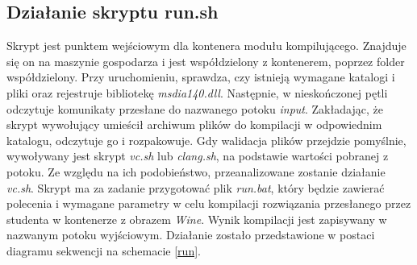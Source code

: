 \subsection{Działanie skryptu run.sh}
Skrypt jest punktem wejściowym dla kontenera modułu kompilującego. Znajduje się on na maszynie gospodarza i jest współdzielony z kontenerem, poprzez folder współdzielony. Przy uruchomieniu, sprawdza, czy istnieją wymagane katalogi i pliki oraz rejestruje bibliotekę \textit{msdia140.dll}. Następnie, w nieskończonej pętli odczytuje komunikaty przesłane do nazwanego potoku \textit{input}. Zakładając, że skrypt wywołujący umieścił archiwum plików do kompilacji w odpowiednim katalogu, odczytuje go i rozpakowuje. Gdy walidacja plików przejdzie pomyślnie, wywoływany jest skrypt \textit{vc.sh} lub \textit{clang.sh}, na podstawie wartości pobranej z potoku. Ze względu na ich podobieństwo, przeanalizowane zostanie działanie \textit{vc.sh}. Skrypt ma za zadanie przygotować plik \textit{run.bat}, który będzie zawierać polecenia i wymagane parametry w celu kompilacji rozwiązania przesłanego przez studenta w kontenerze z obrazem \textit{Wine}. Wynik kompilacji jest zapisywany w nazwanym potoku wyjściowym. Działanie zostało przedstawione w postaci diagramu sekwencji na schemacie \ref{run}.
